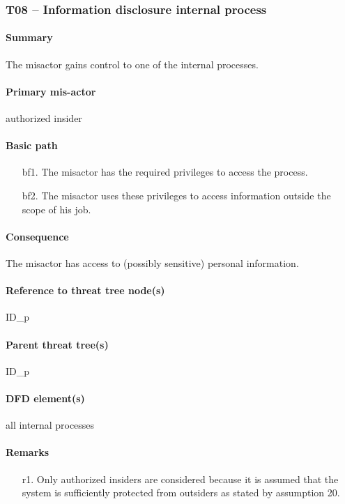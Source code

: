 \subsubsection{T08 -- Information disclosure internal process}

\paragraph{Summary} The misactor gains control to one of the internal processes.

\paragraph{Primary mis-actor} authorized insider

\paragraph{Basic path}
\begin{enumerate}
	\item[bf1.] The misactor has the required privileges to access the process.
	\item[bf2.] The misactor uses these privileges to access information outside
	the scope of his job.
\end{enumerate}

\paragraph{Consequence} The misactor has access to (possibly sensitive)
personal information.

\paragraph{Reference to threat tree node(s)} ID\_p

\paragraph{Parent threat tree(s)} ID\_p

\paragraph{DFD element(s)} all internal processes

\paragraph{Remarks}
\begin{enumerate}
     \item[r1.] Only authorized insiders are considered because it is assumed
     that the system is sufficiently protected from outsiders as stated by
     assumption 20.
\end{enumerate}
